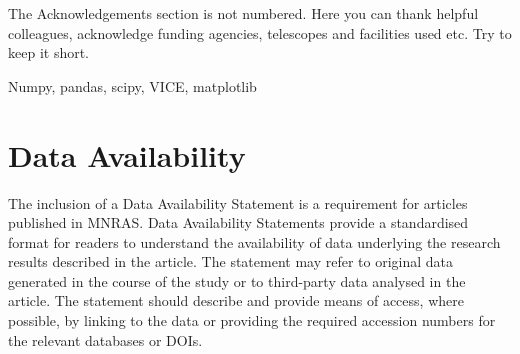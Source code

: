 \documentclass[fleqn,usenatbib]{mnras}
\begin{document}
The Acknowledgements section is not numbered. Here you can thank helpful
colleagues, acknowledge funding agencies, telescopes and facilities used etc.
Try to keep it short.

Numpy, pandas, scipy, VICE, matplotlib
\cite{numpy, matplotlib}

\cite{OhioSupercomputerCenter1987}

\section*{Data Availability}

 
The inclusion of a Data Availability Statement is a requirement for articles published in MNRAS. Data Availability Statements provide a standardised format for readers to understand the availability of data underlying the research results described in the article. The statement may refer to original data generated in the course of the study or to third-party data analysed in the article. The statement should describe and provide means of access, where possible, by linking to the data or providing the required accession numbers for the relevant databases or DOIs.












\appendix
\end{document}
